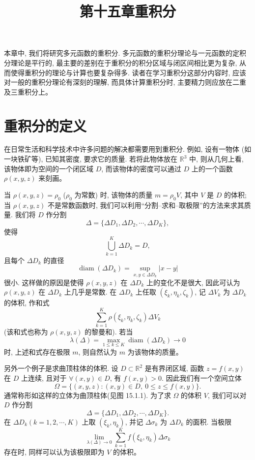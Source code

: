 \documentclass[UTF8, 12pt, fontset=fandol, oneside]{ctexart}
\title{第十五章\quad 重积分}
\author{}
\date{}
\begin{document}
\maketitle

本章中, 我们将研究多元函数的重积分. 多元函数的重积分理论与一元函数的定积分理论是平行的, 最主要的差别在于重积分的积分区域与闭区间相比更为复杂, 从而使得重积分的理论与计算也要复杂得多. 读者在学习重积分这部分内容时, 应该对一般的重积分理论有深刻的理解, 而具体计算重积分时, 主要精力则应放在二重及三重积分上。

\section{重积分的定义}

在日常生活和科学技术中许多问题的解决都需要用到重积分. 例如, 设有一物体 (如一块铁矿等), 已知其密度, 要求它的质量. 若将此物体放在 $\mathbb R^3$ 中, 则从几何上看, 该物体即为空间的一个闭区域 $D$, 而该物体的密度可以通过 $D$ 上的一个函数 $\rho(x,y,z)$ 来刻画。

当 $\rho(x,y,z)=\rho_0$ ($\rho_0$ 为常数) 时, 该物体的质量 $m=\rho_0V$, 其中 $V$ 是 $D$ 的体积; 当 $\rho(x,y,z)$ 不是常数函数时, 我们可以利用“分割--求和--取极限”的方法来求其质量. 我们将 $D$ 作分割
\[
  \Delta=\{\Delta D_1,\Delta D_2,\cdots,\Delta D_K\},
\]
使得
\[
  \bigcup_{k=1}^K\Delta D_k=D,
\]
且每个 $\Delta D_k$ 的直径
\[
  \operatorname{diam}(\Delta D_k)=\sup_{x,y\in\Delta D_k}|x-y|
\]
很小. 这样做的原因是使得 $\rho(x,y,z)$ 在 $\Delta D_k$ 上的变化不是很大, 因此可认为 $\rho(x,y,z)$ 在 $\Delta D_k$ 上几乎是常数. 在 $\Delta D_k$ 上任取 $(\xi_k,\eta_k,\zeta_k)$, 记 $\Delta V_k$ 为 $\Delta D_k$ 的体积, 作和式
\[
  \sum_{k=1}^K\rho(\xi_k,\eta_k,\zeta_k)\Delta V_k
\]
(该和式也称为 $\rho(x,y,z)$ 的黎曼和). 若当
\[
  \lambda(\Delta)=\max_{1\leqslant k\leqslant K}\operatorname{diam}(\Delta D_k)\to0
\]
时, 上述和式存在极限 $m$, 则自然认为 $m$ 为该物体的质量。

另外一个例子是求曲顶柱体的体积. 设 $D\subset\mathbb R^2$ 是有界闭区域, 函数 $z=f(x,y)$ 在 $D$ 上连续, 且对于 $\forall(x,y)\in D$, 有 $f(x,y)>0$. 因此我们有一个空间立体
\[
  \Omega=\{(x,y,z):(x,y)\in D,\ 0\leqslant z\leqslant f(x,y)\}.
\]
通常称形如这样的立体为曲顶柱体(见图 15.1.1). 为了求 $\Omega$ 的体积 $V$, 我们可以对 $D$ 作分割
\[
  \Delta=\{\Delta D_1,\Delta D_2,\cdots,\Delta D_K\}.
\]
在 $\Delta D_k(k=1,2,\cdots,K)$ 上取 $(\xi_k,\eta_k)$, 并记 $\Delta\sigma_k$ 为 $\Delta D_k$ 的面积. 当极限
\[
  \lim_{\lambda(\Delta)\to0}\sum_{k=1}^K f(\xi_k,\eta_k)\Delta\sigma_k
\]
存在时, 同样可以认为该极限即为 $V$ 的体积。
\end{document}
